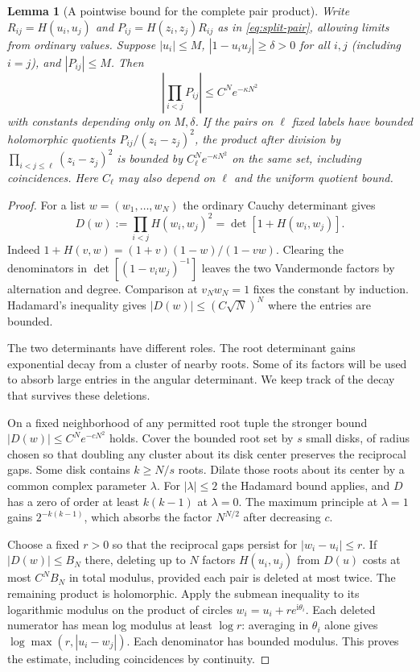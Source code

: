 \documentclass[11pt]{article}
\numberwithin{equation}{section}
\newtheorem{lemma}[theorem]{Lemma}
\theoremstyle{definition}
\newcommand{\ii}{\mathrm i}
\begin{document}
\begin{lemma}[A pointwise bound for the complete pair product]\label{lem:analytic-det}
Write $R_{ij}=H(u_i,u_j)$ and $P_{ij}=H(z_i,z_j)R_{ij}$
as in \eqref{eq:split-pair}, allowing limits from ordinary values.
Suppose $|u_i|\le M$, $|1-u_i u_j|\ge\delta>0$ for all $i,j$
(including $i=j$), and $|P_{ij}|\le M$. Then
\[
             \left|\prod_{i<j}P_{ij}\right|
                    \le C^N e^{-\kappa N^2}
\]
with constants depending only on $M,\delta$. If the pairs on
$\ell$ fixed labels have bounded holomorphic quotients
$P_{ij}/(z_i-z_j)^2$, the product after division by
$\prod_{i<j\le\ell}(z_i-z_j)^2$ is bounded by
$C_\ell^N e^{-\kappa N^2}$ on the same set, including coincidences.
Here $C_\ell$ may also depend on $\ell$ and the uniform quotient bound.
\end{lemma}
\begin{proof}
For a list $w=(w_1,\ldots,w_N)$ the ordinary Cauchy determinant gives
\[
 D(w):=\prod_{i<j}H(w_i,w_j)^2=\det[1+H(w_i,w_j)].
\]
Indeed $1+H(v,w)=(1+v)(1-w)/(1-vw)$. Clearing the denominators
in $\det[(1-v_iw_j)^{-1}]$ leaves the two Vandermonde factors by
alternation and degree. Comparison at $v_Nw_N=1$ fixes the constant
by induction. Hadamard's inequality gives $|D(w)|\le(C\sqrt N)^N$
where the entries are bounded.

The two determinants have different roles. The root determinant gains
exponential decay from a cluster of nearby roots. Some of its factors
will be used to absorb large entries in the angular determinant. We
keep track of the decay that survives these deletions.

On a fixed neighborhood of any permitted root tuple the stronger
bound $|D(w)|\le C^N e^{-cN^2}$ holds. Cover the bounded root set
by $s$ small disks, of radius chosen so that doubling any cluster
about its disk center preserves the reciprocal gaps. Some disk contains
$k\ge N/s$ roots. Dilate those roots about its
center by a common complex parameter $\lambda$. For $|\lambda|\le2$
the Hadamard bound applies, and $D$ has a zero of order at least
$k(k-1)$ at $\lambda=0$. The maximum principle at $\lambda=1$
gains $2^{-k(k-1)}$, which absorbs the factor $N^{N/2}$ after
decreasing $c$.

Choose a fixed $r>0$ so that the reciprocal gaps persist for
$|w_i-u_i|\le r$. If $|D(w)|\le B_N$ there, deleting up to $N$
factors $H(u_i,u_j)$ from $D(u)$ costs at most $C^N B_N$ in total
modulus, provided each pair is deleted at most twice. The remaining
product is holomorphic. Apply the submean inequality to its logarithmic
modulus on the product of circles $w_i=u_i+r e^{\ii\theta_i}$.
Each deleted numerator has mean log modulus at least $\log r$:
averaging in $\theta_i$ alone gives $\log\max(r,|u_i-w_j|)$.
Each denominator has bounded modulus. This proves the estimate,
including coincidences by continuity.


\end{proof}
\end{document}
